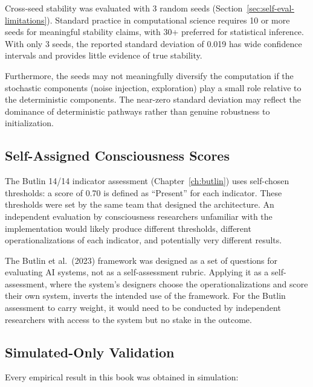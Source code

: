 \documentclass[12pt]{book}
\begin{document}
Cross-seed stability was evaluated with 3 random seeds (Section~\ref{sec:self-eval-limitations}). Standard practice in computational science requires 10 or more seeds for meaningful stability claims, with 30+ preferred for statistical inference. With only 3 seeds, the reported standard deviation of 0.019 has wide confidence intervals and provides little evidence of true stability.

Furthermore, the seeds may not meaningfully diversify the computation if the stochastic components (noise injection, exploration) play a small role relative to the deterministic components. The near-zero standard deviation may reflect the dominance of deterministic pathways rather than genuine robustness to initialization.

\subsection{Self-Assigned Consciousness Scores}

The Butlin 14/14 indicator assessment (Chapter~\ref{ch:butlin}) uses self-chosen thresholds: a score of 0.70 is defined as ``Present'' for each indicator. These thresholds were set by the same team that designed the architecture. An independent evaluation by consciousness researchers unfamiliar with the implementation would likely produce different thresholds, different operationalizations of each indicator, and potentially very different results.

The Butlin et al.\ (2023) framework was designed as a set of questions for evaluating AI systems, not as a self-assessment rubric. Applying it as a self-assessment, where the system's designers choose the operationalizations and score their own system, inverts the intended use of the framework. For the Butlin assessment to carry weight, it would need to be conducted by independent researchers with access to the system but no stake in the outcome.

\subsection{Simulated-Only Validation}

Every empirical result in this book was obtained in simulation:
\end{document}
